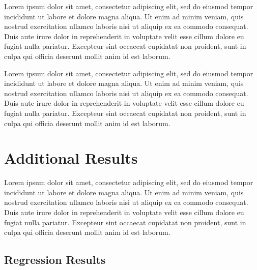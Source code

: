 \documentclass[11pt]{article}
\begin{document}
Lorem ipsum dolor sit amet, consectetur adipiscing elit, sed do eiusmod tempor incididunt ut labore et dolore magna aliqua. Ut enim ad minim veniam, quis nostrud exercitation ullamco laboris nisi ut aliquip ex ea commodo consequat. Duis aute irure dolor in reprehenderit in voluptate velit esse cillum dolore eu fugiat nulla pariatur. Excepteur sint occaecat cupidatat non proident, sunt in culpa qui officia deserunt mollit anim id est laborum. 

Lorem ipsum dolor sit amet, consectetur adipiscing elit, sed do eiusmod tempor incididunt ut labore et dolore magna aliqua. Ut enim ad minim veniam, quis nostrud exercitation ullamco laboris nisi ut aliquip ex ea commodo consequat. Duis aute irure dolor in reprehenderit in voluptate velit esse cillum dolore eu fugiat nulla pariatur. Excepteur sint occaecat cupidatat non proident, sunt in culpa qui officia deserunt mollit anim id est laborum. 


\newpage
\printbibliography


\newpage
\appendix
{}
\renewcommand{\thefigure}{\Alph{section}\arabic{figure}}
\renewcommand{\thetable}{\Alph{section}\arabic{table}}

\section{Additional Results}

Lorem ipsum dolor sit amet, consectetur adipiscing elit, sed do eiusmod tempor incididunt ut labore et dolore magna aliqua. Ut enim ad minim veniam, quis nostrud exercitation ullamco laboris nisi ut aliquip ex ea commodo consequat. Duis aute irure dolor in reprehenderit in voluptate velit esse cillum dolore eu fugiat nulla pariatur. Excepteur sint occaecat cupidatat non proident, sunt in culpa qui officia deserunt mollit anim id est laborum. 

\subsection{Regression Results}
\end{document}

